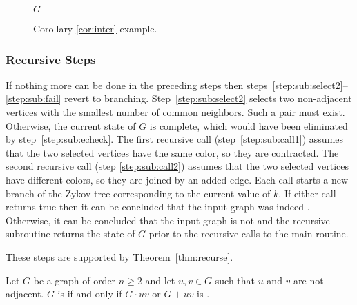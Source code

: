 \begin{figure}[H]
  \centering

  \(G\)
  \caption{Corollary \ref{cor:inter} example.}
  \label{fig:inter}
\end{figure}

\subsubsection{Recursive Steps}

If nothing more can be done in the preceding steps then steps~\ref{step:sub:select2}--\ref{step:sub:fail} revert to
branching.  Step~\ref{step:sub:select2} selects two non-adjacent vertices with the smallest number of common
neighbors.  Such a pair must exist.  Otherwise, the current state of \(G\) is complete, which would have been
eliminated by step~\ref{step:sub:echeck}.  The first recursive call (step~\ref{step:sub:call1}) assumes that the
two selected vertices have the same color, so they are contracted.  The second recursive call (step
\ref{step:sub:call2}) assumes that the two selected vertices have different colors, so they are joined by an added
edge.  Each call starts a new branch of the Zykov tree corresponding to the current value of \(k\).  If either call
returns true then it can be concluded that the input graph was indeed .  Otherwise, it can be
concluded that the input graph is not  and the recursive subroutine returns the state of \(G\) prior
to the recursive calls to the main routine.

These steps are supported by Theorem~\ref{thm:recurse}.

\begin{theorem}
  \label{thm:recurse}
  Let \(G\) be a graph of order \(n\ge2\) and let \(u,v\in G\) such that \(u\) and \(v\) are not adjacent.  \(G\)
  is  if and only if \(G\cdot uv\) or \(G+uv\) is .
\end{theorem}

